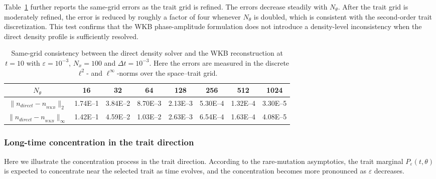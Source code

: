 \documentclass[11pt]{article}
\numberwithin{equation}{section}
\begin{document}
Table~\ref{tab:test3_same_grid_consistency} further reports the same-grid
errors as the trait grid is refined.  The errors decrease steadily with \(N_\theta\).
After the trait grid is moderately refined, the error is reduced by roughly a
factor of four whenever \(N_\theta\) is doubled, which is consistent with the
second-order trait discretization.  This test confirms that the WKB
phase-amplitude formulation does not introduce a density-level inconsistency
when the direct density profile is sufficiently resolved.

\begin{table}[htbp]
\centering
\caption{Same-grid consistency between the direct density solver and the WKB
reconstruction at  \(t=10\) with \(\varepsilon=10^{-3}\), \(N_x=100\) and $\Delta t = 10^{-3}$. Here the errors are measured in the discrete \(\ell^2\)- and
\(\ell^\infty\)-norms over the space--trait grid.}
\label{tab:test3_same_grid_consistency}
\vspace{0.5em}
\begin{tabular}{c|ccccccc}
\hline
 \(N_\theta\)  & 16 & 32 & 64 & 128 & 256 & 512 & 1024\\%
\hline
 \(\|n_{direct} - n_{_{WKB}}\|_2\)  &1.74E--1 & 3.84E--2 & 8.70E--3  & 2.13E--3  & 5.30E--4 & 1.32E--4 & 3.30E--5\\%
\hline
 \(\|n_{direct} - n_{_{WKB}}\|_\infty\)  &1.42E--1 & 4.59E--2 & 1.03E--2  & 2.63E--3  & 6.54E--4 & 1.63E--4 & 4.08E--5\\%
\hline
\end{tabular}
\end{table}




\subsubsection{Long-time concentration in the trait direction}
\label{subsec:test_long_time_concentration_new}
Here we illustrate the concentration process in the trait direction.
According to the rare-mutation asymptotics, the trait marginal
\(P_\varepsilon(t,\theta)\) is expected
to concentrate near the selected trait as time evolves, and the concentration
becomes more pronounced as \(\varepsilon\) decreases.
\end{document}
